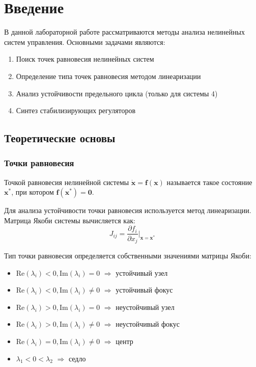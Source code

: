 \section*{Введение}

В данной лабораторной работе рассматриваются методы анализа нелинейных систем управления. Основными задачами являются:

\begin{enumerate}
\item Поиск точек равновесия нелинейных систем
\item Определение типа точек равновесия методом линеаризации
\item Анализ устойчивости предельного цикла (только для системы 4)
\item Синтез стабилизирующих регуляторов
\end{enumerate}

\subsection*{Теоретические основы}

\subsubsection*{Точки равновесия}

Точкой равновесия нелинейной системы $\dot{\mathbf{x}} = \mathbf{f}(\mathbf{x})$ называется такое состояние $\mathbf{x}^*$, при котором $\mathbf{f}(\mathbf{x}^*) = \mathbf{0}$.

Для анализа устойчивости точки равновесия используется метод линеаризации. Матрица Якоби системы вычисляется как:
$$J_{ij} = \frac{\partial f_i}{\partial x_j}\bigg|_{\mathbf{x} = \mathbf{x}^*}$$

Тип точки равновесия определяется собственными значениями матрицы Якоби:
\begin{itemize}
\item $\text{Re}(\lambda_i) < 0, \text{Im}(\lambda_i) = 0 $ $\Rightarrow$ устойчивый узел
\item $\text{Re}(\lambda_i) < 0, \text{Im}(\lambda_i) \neq 0 $ $\Rightarrow$ устойчивый фокус
\item $\text{Re}(\lambda_i) > 0, \text{Im}(\lambda_i) = 0 $ $\Rightarrow$ неустойчивый узел
\item $\text{Re}(\lambda_i) > 0, \text{Im}(\lambda_i) \neq 0 $ $\Rightarrow$ неустойчивый фокус
\item $\text{Re}(\lambda_i) = 0, \text{Im}(\lambda_i) \neq 0 $ $\Rightarrow$ центр
\item $\lambda_1 < 0 < \lambda_2 $ $\Rightarrow$ седло
\end{itemize}

